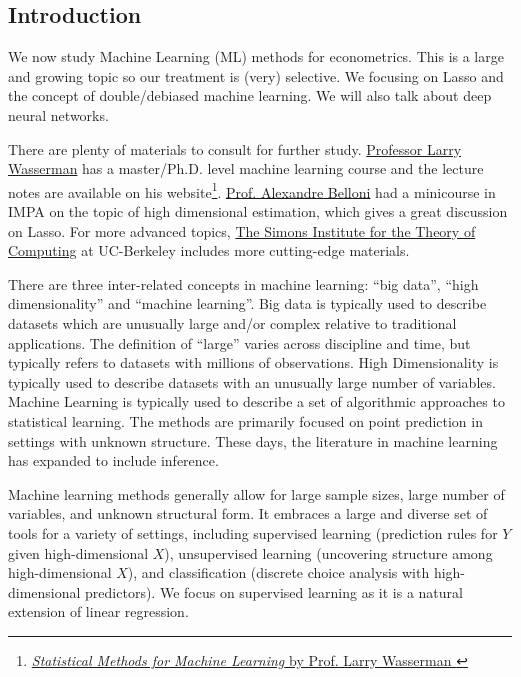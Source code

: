 \documentclass[11pt,a4paper]{amsart}
\theoremstyle{plain}
\theoremstyle{definition}
\begin{document}
\subsection{Introduction}\hfil\par 
	We now study Machine Learning (ML) methods for econometrics. This is a large and growing topic so our treatment is (very) selective. We focusing on Lasso and the concept of double/debiased machine learning. We will also talk about deep neural networks.\par 
	There are plenty of materials to consult for further study. \href{https://www.stat.cmu.edu/~larry/}{Professor Larry Wasserman} has a master/Ph.D. level machine learning course and the lecture notes are available on his website\footnote{\href{https://www.stat.cmu.edu/~larry/=sml/}{\textit{Statistical Methods for Machine Learning} by Prof.  Larry Wasserman
	}}. \href{https://faculty.fuqua.duke.edu/~abn5/belloni-index.html}{Prof. Alexandre Belloni} had a minicourse in IMPA on the topic of high dimensional estimation, which gives a great discussion on Lasso. For more advanced topics, \href{https://simons.berkeley.edu/}{The Simons Institute for the Theory of Computing} at UC-Berkeley includes more cutting-edge materials.\par 
	There are three inter-related concepts in machine learning: “big data”, “high dimensionality” and “machine learning”. Big data is typically used to describe datasets which are unusually large and/or complex relative to traditional applications. The deﬁnition of “large” varies across discipline and time, but typically refers to datasets with millions of observations. High Dimensionality is typically used to describe datasets with an unusually large number of variables. Machine Learning is typically used to describe a set of algorithmic approaches to statistical learning. The methods are primarily focused on point prediction in settings with unknown structure. These days, the literature in machine learning has expanded to include inference.\par 
	Machine learning methods generally allow for large sample sizes, large number of variables, and unknown structural form. It embraces a large and diverse set of tools for a variety of settings, including supervised learning (prediction rules for $Y$ given high-dimensional $X$), unsupervised learning (uncovering structure among high-dimensional $X$), and classiﬁcation (discrete choice analysis with high-dimensional predictors). We focus on supervised learning as it is a natural extension of linear regression.\par 
\end{document}
